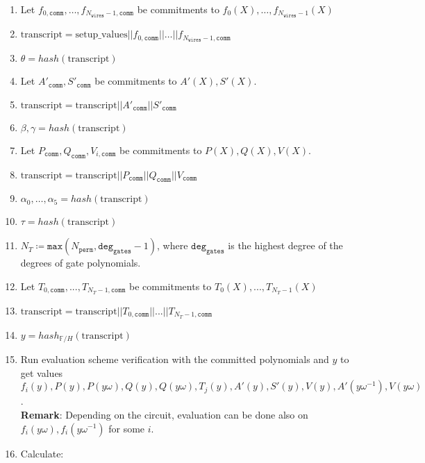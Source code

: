 \begin{enumerate}
    \item Let $f_{0, \texttt{comm}}, \dots, f_{N_{\texttt{wires}} - 1, \texttt{comm}}$ be commitments to $f_{0}(X), \dots, f_{N_{\texttt{wires}} - 1}(X)$
    \item $\text{transcript} = \text{setup\_values} || f_{0, \texttt{comm}} || \dots || f_{N_{\texttt{wires}} - 1, \texttt{comm}}$
    \item $\theta = hash(\text{transcript})$
    \item Let $A'_{\texttt{comm}}, S'_{\texttt{comm}}$ be commitments to $A'(X), S'(X)$.
    \item $\text{transcript} = \text{transcript} || A'_{\texttt{comm}} || S'_{\texttt{comm}}$ 
    \item $\beta, \gamma = hash(\text{transcript})$
    \item Let $P_{\texttt{comm}}, Q_{\texttt{comm}}, V_{i, \texttt{comm}}$ be commitments to $P(X), Q(X), V(X)$.
    \item $\text{transcript} = \text{transcript} || P_{\texttt{comm}} || Q_{\texttt{comm}} || V_{\texttt{comm}}$
    \item $\alpha_0, \dots, \alpha_5 = hash(\text{transcript})$
    \item $\tau = hash(\text{transcript})$
    \item $N_T \coloneqq \texttt{max}(N_{\texttt{perm}}, \texttt{deg}_{\texttt{gates}} - 1)$, 
		where $\texttt{deg}_{\texttt{gates}}$ is the highest degree of the degrees of gate polynomials. 
    \item Let $T_{0, \texttt{comm}}, ..., T_{N_T - 1, \texttt{comm}}$ be commitments to $T_0(X), ..., T_{N_T - 1}(X)$ 
    \item $\text{transcript} = \text{transcript} || T_{0, \texttt{comm}} || ... || T_{N_T - 1, \texttt{comm}}$
    \item $y = hash_{\mathbb{F}/H}(\text{transcript})$
    \item Run evaluation scheme verification with the committed polynomials and $y$ to get values 
        $f_i(y), P(y), P(y\omega), Q(y), Q(y\omega), T_j(y), A'(y), S'(y), V(y), A'(y\omega^{-1}), V(y\omega)$.  \\
        \textbf{Remark}: Depending on the circuit, evaluation can be done also on $f_i(y\omega), f_i(y\omega^{-1})$ for some $i$.
        \label{algoeirhm:verifier:15}
    \item Calculate:\label{algoeirhm:verifier:16}
        \begin{center}

\end{center}
\end{enumerate}
